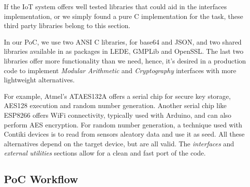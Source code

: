 If the IoT system offers well tested libraries that could aid in the interfaces implementation, or we simply found a pure C implementation for the task, these third party libraries belong to this section.

In our PoC, we use two ANSI C libraries, for base64 and JSON, and two shared libraries available in as packages in LEDE, GMPLib and OpenSSL. The last two libraries offer more functionality than we need, hence, it's desired in a production code to implement \textit{Modular Arithmetic} and \textit{Cryptography} interfaces with more lightweight alternatives.

For example, Atmel's ATAES132A \citep{ATAES132A}
offers a serial chip for secure key storage, AES128 execution and random number generation. Another serial chip like ESP8266 offers WiFi connectivity, typically used with Arduino, and can also perform AES encryption. For random number generation, a technique used with Contiki devices is to read from sensors aleatory data and use it as seed. All these alternatives depend on the target device, but are all valid. The \textit{interfaces} and \textit{external utilities} sections allow for a clean and fast port of the code.


\subsection{PoC Workflow}



